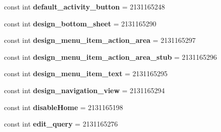 \begin{DoxyCompactItemize}
\item 
\mbox{\label{class_sample_app_1_1_droid_1_1_resource_1_1_id_af6d94ba99c40084518b3e22a121a6d27}} 
const int {\bfseries default\+\_\+activity\+\_\+button} = 2131165248
\item 
\mbox{\label{class_sample_app_1_1_droid_1_1_resource_1_1_id_a916f237b4095c306cbb1f624707b8f9c}} 
const int {\bfseries design\+\_\+bottom\+\_\+sheet} = 2131165290
\item 
\mbox{\label{class_sample_app_1_1_droid_1_1_resource_1_1_id_a85be86829596c0e7ed0ad9c6940c761f}} 
const int {\bfseries design\+\_\+menu\+\_\+item\+\_\+action\+\_\+area} = 2131165297
\item 
\mbox{\label{class_sample_app_1_1_droid_1_1_resource_1_1_id_af515d2fedeacb4d6111cc16c8d373c71}} 
const int {\bfseries design\+\_\+menu\+\_\+item\+\_\+action\+\_\+area\+\_\+stub} = 2131165296
\item 
\mbox{\label{class_sample_app_1_1_droid_1_1_resource_1_1_id_ade42dd8f8b8ab6eabe5c0bdd375d8b70}} 
const int {\bfseries design\+\_\+menu\+\_\+item\+\_\+text} = 2131165295
\item 
\mbox{\label{class_sample_app_1_1_droid_1_1_resource_1_1_id_aa2d39142a9c8592d9a27ad9e1dc5fafc}} 
const int {\bfseries design\+\_\+navigation\+\_\+view} = 2131165294
\item 
\mbox{\label{class_sample_app_1_1_droid_1_1_resource_1_1_id_a270faf377dcd6cb9e0b24c862b34458c}} 
const int {\bfseries disable\+Home} = 2131165198
\item 
\mbox{\label{class_sample_app_1_1_droid_1_1_resource_1_1_id_ae16f0852f9c175c140fc2069601404cf}} 
const int {\bfseries edit\+\_\+query} = 2131165276
\item 
\mbox{\label{class_sample_app_1_1_droid_1_1_resource_1_1_id_ab03bf7a61a240a2a2ead658bfc3de74a}} 

\end{DoxyCompactItemize}
